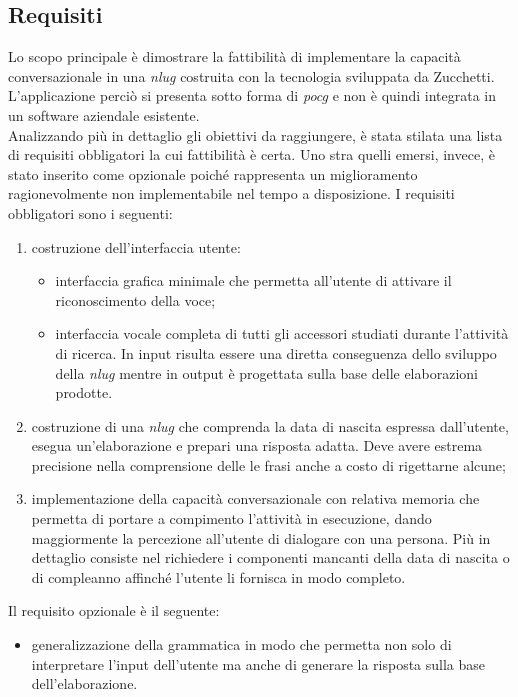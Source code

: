 	\subsection{Requisiti}
	Lo scopo principale è dimostrare la fattibilità di implementare la capacità conversazionale in una \emph{\gls{nlug}} costruita con la tecnologia sviluppata da Zucchetti. L'applicazione perciò si presenta sotto forma di \emph{\gls{pocg}} e non è quindi integrata in un software aziendale esistente. \\
	Analizzando più in dettaglio gli obiettivi da raggiungere, è stata stilata una lista di requisiti obbligatori la cui fattibilità è certa. Uno stra quelli emersi, invece, è stato inserito come opzionale poiché rappresenta un miglioramento ragionevolmente non implementabile nel tempo a disposizione.
	I requisiti obbligatori sono i seguenti:
	\begin{enumerate}
		\item costruzione dell'interfaccia utente:
			\begin{itemize}
				\item interfaccia grafica minimale che permetta all'utente di attivare il riconoscimento della voce;
				\item interfaccia vocale completa di tutti gli accessori studiati durante l'attività di ricerca. In input risulta essere una diretta conseguenza dello sviluppo della \emph{\gls{nlug}} mentre in output è progettata sulla base delle elaborazioni prodotte.
			\end{itemize}
		\item costruzione di una \emph{\gls{nlug}} che comprenda la data di nascita espressa dall'utente, esegua un'elaborazione e prepari una risposta adatta. Deve avere estrema precisione nella comprensione delle le frasi anche a costo di rigettarne alcune;
		\item implementazione della capacità conversazionale con relativa memoria che permetta di portare a compimento l'attività in esecuzione, dando maggiormente la percezione all'utente di dialogare con una persona. Più in dettaglio consiste nel richiedere i componenti mancanti della data di nascita o di compleanno affinché l'utente li fornisca in modo completo.
	\end{enumerate}
	Il requisito opzionale è il seguente:
	\begin{itemize}
		\item generalizzazione della grammatica in modo che permetta non solo di interpretare l'input dell'utente ma anche di generare la risposta sulla base dell'elaborazione.
	\end{itemize}
